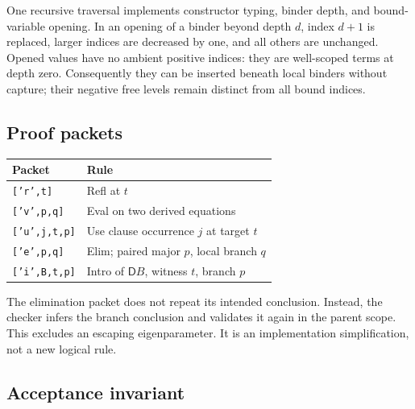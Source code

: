 \documentclass[11pt]{article}
\theoremstyle{definition}\newtheorem{definition}[theorem]{Definition}
\newcommand{\D}{\mathsf D}
\begin{document}
One recursive traversal implements constructor typing, binder depth,
and bound-variable opening. In an opening of a binder beyond depth
$d$, index $d+1$ is replaced, larger indices are decreased by one,
and all others are unchanged. Opened values have no ambient positive
indices: they are well-scoped terms at depth zero. Consequently they
can be inserted beneath local binders without capture; their negative
free levels remain distinct from all bound indices.

\subsection{Proof packets}

\begin{center}
\begin{tabular}{@{}ll@{}}
\toprule
Packet & Rule\\
\midrule
\texttt{['r',t]} & Refl at $t$\\
\texttt{['v',p,q]} & Eval on two derived equations\\
\texttt{['u',j,t,p]} & Use clause occurrence $j$ at target $t$\\
\texttt{['e',p,q]} & Elim; paired major $p$, local branch $q$\\
\texttt{['i',B,t,p]} & Intro of $\D B$, witness $t$, branch $p$\\
\bottomrule
\end{tabular}
\end{center}
The elimination packet does not repeat its intended conclusion.
Instead, the checker infers the branch conclusion and validates it
again in the parent scope. This excludes an escaping eigenparameter.
It is an implementation simplification, not a new logical rule.

\subsection{Acceptance invariant}
\end{document}
